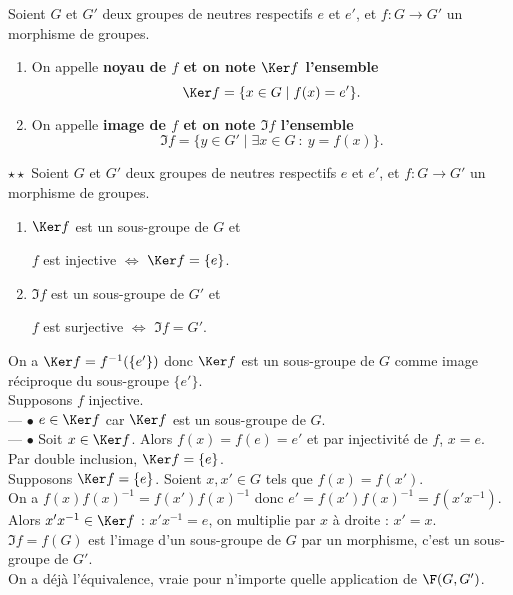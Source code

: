 \documentclass[11pt]{article}
\begin{document}
\begin{defi}{}{}
    Soient $G$ et $G'$ deux groupes de neutres respectifs $e$ et $e'$, et $f:G\to G'$ un morphisme de groupes.
    \begin{enumerate}
        \item On appelle \bf{noyau} de $f$ et on note $\Ker f$ l'ensemble
        \begin{equation*}
            \Ker f = \{x \in G \mid f(x)=e'\}.
        \end{equation*}
        \item On appelle \bf{image} de $f$ et on note $\Im f$ l'ensemble
        \begin{equation*}
            \Im f = \{y \in G' \mid \exists x \in G ~:~ y = f(x)\}.
        \end{equation*}
    \end{enumerate}
\end{defi}

\begin{prop}{$\star\star$}{}
    Soient $G$ et $G'$ deux groupes de neutres respectifs $e$ et $e'$, et $f:G\to G'$ un morphisme de groupes.
    \begin{enumerate}
        \item $\Ker f$ est un sous-groupe de $G$ et
        \begin{center}
            $f$ est injective $\iff$ $\Ker f = \{e\}$.
        \end{center} 
        \item $\Im f$ est un sous-groupe de $G'$ et
        \begin{center}
            $f$ est surjective $\iff$ $\Im f = G'$.
        \end{center}
    \end{enumerate}
    \tcblower
     On a $\Ker f=f^{-1}(\{e'\})$ donc $\Ker f$ est un sous-groupe de $G$ comme image réciproque du sous-groupe $\{e'\}$.\\
    \boxed{\ra} Supposons $f$ injective.\\
    --- $\bullet$ $e\in\Ker f$ car $\Ker f$ est un sous-groupe de $G$.\\
    --- $\bullet$ Soit $x\in\Ker f$. Alors $f(x)=f(e)=e'$ et par injectivité de $f$, $x=e$.\\
    Par double inclusion, $\Ker f = \{e\}$.\\
    \boxed{\la} Supposons $\Ker f = \{e\}$. Soient $x,x'\in G$ tels que $f(x)=f(x')$.\\
    On a $f(x)f(x)^{-1}=f(x')f(x)^{-1}$ donc $e'=f(x')f(x)^{-1}=f(x'x^{-1})$.\\
    Alors $x'x^{-1}\in\Ker f$ : $x'x^{-1}=e$, on multiplie par $x$ à droite : $x'=x$.\n
     $\Im f = f(G)$ est l'image d'un sous-groupe de $G$ par un morphisme, c'est un sous-groupe de $G'$.\\
    On a déjà l'équivalence, vraie pour n'importe quelle application de $\F(G,G')$.
\end{prop}
\end{document}
